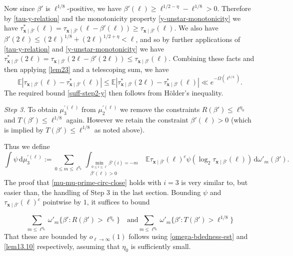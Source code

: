 \documentclass[11pt,reqno]{amsart}
\numberwithin{equation}{section}
\theoremstyle{definition}
\theoremstyle{remark}
\newcommand{\mb}{\mathbb}
\newcommand{\mbf}{\mathbf}
\renewcommand{\le}{\leqslant}
\renewcommand{\ge}{\geqslant}
\begin{document}
Now since $\beta'$ is $\ell^{1/8}$-positive, we have $\beta'(\ell) \ge \ell^{1/2 - \eta} - \ell^{1/8} > 0$. Therefore by \cref{tau-y-relation} and the monotonicity property \cref{y-unstar-monotonicity} we have $\tau^*_{\mbf{x} \mid \beta'}(\ell) = \tau_{\mbf{x} \mid \beta'}(\ell - \beta'(\ell)) \ge \tau_{\mbf{x} \mid \beta'}(\ell)$. We also have $\beta'(2\ell) \le (2\ell)^{1/8} + (2\ell)^{1/2 + \eta} < \ell$, and so by further applications of \cref{tau-y-relation} and \cref{y-unstar-monotonicity} we have $\tau^*_{\mbf{x} \mid \beta'}(2\ell) = \tau_{\mbf{x} \mid \beta'}(2 \ell - \beta'(2\ell)) \le \tau_{\mbf{x} \mid \beta'}(\ell)$. Combining these facts and then applying \cref{lem23} and a telescoping sum, we have
\[ \mb{E} |\tau_{\mbf{x}\mid \beta'}(\ell)  -\tau^*_{\mbf{x} \mid \beta'}(\ell)| \le \mb{E} |\tau^*_{\mbf{x} \mid \beta'}(2\ell) -\tau^*_{\mbf{x} \mid \beta'}(\ell)|  \ll e^{-\Omega(\ell^{1/4})}.\] The required bound \cref{suff-step2-y} then follows from H\"older's inequality.
\vspace*{10pt}

\emph{Step 3.} To obtain $\mu_3^{\prime (\ell)}$ from $\mu_2^{\prime (\ell)}$ we remove the constraints $R(\beta') \le \ell^{\eta_0}$ and $T(\beta') \le \ell^{1/8}$ again. However we retain the constraint $\beta'(\ell) > 0$ (which is implied by $T(\beta') \le \ell^{1/8}$ as noted above).

Thus we define
\begin{equation}\label{mu-dash-ell-3} \int \psi \, \mathrm{d} \mu_3^{\prime (\ell)} := \sum_{0 \le m \le \ell^{\eta_0}}\int_{\substack{\min_{0 \le i \le \ell} \beta'(i) = -m\\ \beta'(\ell) > 0}} \mb{E} \tau_{\mbf{x} \mid \beta'}(\ell)^c \psi (\log_2 \tau_{\mbf{x} \mid \beta'}(\ell)) \, \mathrm{d}\omega'_m(\beta').\end{equation} 
The proof that \cref{mu-mu-prime-circ-close} holds with $i = 3$ is very similar to, but easier than, the handling of Step 3 in the last section. Bounding $\psi$ and $\tau_{\mbf{x} \mid \beta'}(\ell)^c$ pointwise by $1$, it suffices to bound

\begin{equation*} \sum_{m \le \ell^{\eta_0}} \omega'_m \{ \beta': R(\beta') > \ell^{\eta_0}\} \quad \mbox{and} \sum_{m \le \ell^{\eta_0}} \omega'_m \{ \beta': T(\beta') > \ell^{1/8}\}\end{equation*}
That these are bounded by $o_{\ell \rightarrow \infty}(1)$ follows using \cref{omega-bdedness-est} and \cref{lem13.10} respectively, assuming that $\eta_0$ is sufficiently small.
\vspace*{8pt}
\end{document}
